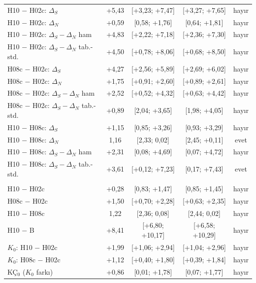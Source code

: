 \begin{table}[!htbp]
\begin{tabularx}{\textwidth}{>{\raggedright\arraybackslash}X cccc}
H10 $-$ H02c: $\Delta_S$ & +5,43 & [+3,23; +7,47] & [+3,27; +7,65] & hayır \\
H10 $-$ H02c: $\Delta_N$ & +0,59 & [\textminus{}0,58; +1,76] & [\textminus{}0,64; +1,81] & hayır \\
H10 $-$ H02c: $\Delta_S{-}\Delta_N$ ham & +4,83 & [+2,22; +7,18] & [+2,36; +7,30] & hayır \\
H10 $-$ H02c: $\Delta_S{-}\Delta_N$ tab.-std. & +4,50 & [+0,78; +8,06] & [+0,68; +8,50] & hayır \\
H08c $-$ H02c: $\Delta_S$ & +4,27 & [+2,56; +5,89] & [+2,69; +6,02] & hayır \\
H08c $-$ H02c: $\Delta_N$ & +1,75 & [+0,91; +2,60] & [+0,89; +2,61] & hayır \\
H08c $-$ H02c: $\Delta_S{-}\Delta_N$ ham & +2,52 & [+0,52; +4,32] & [+0,63; +4,42] & hayır \\
H08c $-$ H02c: $\Delta_S{-}\Delta_N$ tab.-std. & +0,89 & [\textminus{}2,04; +3,65] & [\textminus{}1,98; +4,05] & hayır \\
H10 $-$ H08c: $\Delta_S$ & +1,15 & [\textminus{}0,85; +3,26] & [\textminus{}0,93; +3,29] & hayır \\
H10 $-$ H08c: $\Delta_N$ & \textminus{}1,16 & [\textminus{}2,33; \textminus{}0,02] & [\textminus{}2,45; +0,11] & evet \\
H10 $-$ H08c: $\Delta_S{-}\Delta_N$ ham & +2,31 & [\textminus{}0,08; +4,69] & [\textminus{}0,07; +4,72] & hayır \\
H10 $-$ H08c: $\Delta_S{-}\Delta_N$ tab.-std. & +3,61 & [+0,12; +7,23] & [\textminus{}0,17; +7,43] & evet \\
\multicolumn{5}{@{}l}{\textit{C0: C-test alt kümesi (n = 1.227); $K_0$ ve KÇ$_0$ ortak bootstrap}} \\
H10 $-$ H02c & +0,28 & [\textminus{}0,83; +1,47] & [\textminus{}0,85; +1,45] & hayır \\
H08c $-$ H02c & +1,50 & [+0,70; +2,28] & [+0,63; +2,35] & hayır \\
H10 $-$ H08c & \textminus{}1,22 & [\textminus{}2,36; \textminus{}0,08] & [\textminus{}2,44; \textminus{}0,02] & hayır \\
H10 $-$ B & +8,41 & [+6,80; +10,17] & [+6,58; +10,29] & hayır \\
$K_0$: H10 $-$ H02c & +1,99 & [+1,06; +2,94] & [+1,04; +2,96] & hayır \\
$K_0$: H08c $-$ H02c & +1,12 & [+0,40; +1,80] & [+0,39; +1,84] & hayır \\
KÇ$_0$ ($K_0$ farkı) & +0,86 & [\textminus{}0,01; +1,78] & [\textminus{}0,07; +1,77] & hayır \\

\end{tabularx}
\end{table}

